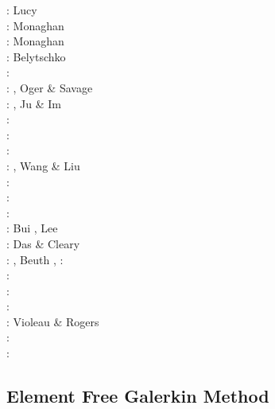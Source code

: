 \begin{scriptsize}
\nineteenseventyseven: Lucy \cite{lucy77}\\
\nineteeneightyfive: Monaghan \cite{mona85}\\
\nineteenninetytwo: Monaghan \cite{mona92}\\
\nineteenninetysix: Belytschko \etal \cite{beko96}\\
\nineteenninetyseven: \cite{mofz97}\\
\nineteenninetynine: \cite{zhfm99}, Oger \& Savage \cite{ogsa99}\\
\twothousand: \cite{begl00}\cite{lihl00}, Ju \& Im \cite{juim00}\\
\twothousandone: \cite{idso01}\\
\twothousandtwo: \cite{lilr02}\cite{lill02}\cite{lili02}\\
\twothousandthree: \cite{lill03}\cite{mamo03}\\
\twothousandfour: \cite{hufl04}, Wang \& Liu \cite{wali04}\\
\twothousandfive: \cite{febh05}\cite{lixl05}\cite{thes05}\cite{thje05a}\cite{thje05b}\\
\twothousandsix: \cite{lili06}\cite{yabm06}\\
\twothousandseven: \cite{busf07}\\
\twothousandeight: Bui \etal \cite{bufs08}, Lee \etal \cite{lemx08}\\
\twothousandten: Das \& Cleary \cite{dacl10}\\
\twothousandeleven: \cite{prcl11}\cite{kukg11}
                    \cite{kadm11}\cite{szpt11}
                    \cite{howt11}, Beuth \etal \cite{bewv11},
\twothousandtwelve: \cite{szpm12}\\
\twothousandthirteen: \cite{koau13}\cite{viau13}\\
\twothousandfourteen: \cite{dazs14}\cite{lekb14}\\
\twothousandfifteen: \cite{nifs15}\\
\twothousandsixteen: Violeau \& Rogers \cite{viro16}\\
\twothousandeighteen: \cite{krrk18}\cite{goej18}\\
\twothousandnineteen: \cite{meho19}\cite{meho19b}
\end{scriptsize}

\subsection{Element Free Galerkin Method}

